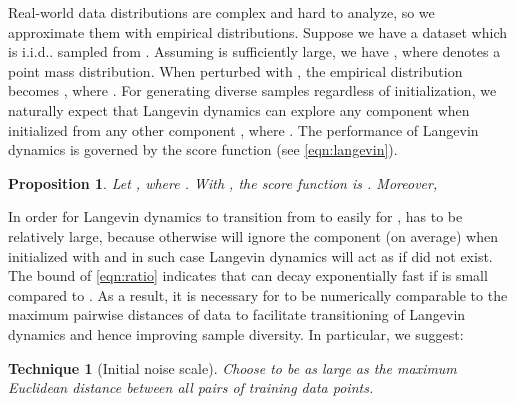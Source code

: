 \documentclass{article}
\makeatletter
\newtheorem{recipe}{Technique}
\newtheorem{proposition}{Proposition}
\def\@onedot{\ifx\@let@token.\else.\null\fi\xspace}
\DeclareRobustCommand\onedot{\futurelet\@let@token\@onedot}
\def\iid{i.i.d\onedot}
\makeatother
\begin{document}
Real-world data distributions are complex and hard to analyze, so we approximate them with empirical distributions. Suppose we have a dataset  which is \iid sampled from . Assuming  is sufficiently large, we have , where  denotes a point mass distribution. When perturbed with , the empirical distribution becomes , where . For generating diverse samples regardless of initialization, we naturally expect that Langevin dynamics can explore any component  when initialized from any other component , where . The performance of Langevin dynamics is governed by the score function  (see \cref{eqn:langevin}).

\begin{proposition}\label{prop:init_noise}
Let , where . With , the score function is . Moreover,

\end{proposition}
In order for Langevin dynamics to transition from  to  easily for ,  has to be relatively large, because otherwise  will ignore the component  (on average) when initialized with  and in such case Langevin dynamics will act as if  did not exist. The bound of \cref{eqn:ratio} indicates that  can decay exponentially fast if  is small compared to . As a result, it is necessary for  to be numerically comparable to the maximum pairwise distances of data to facilitate transitioning of Langevin dynamics and hence improving sample diversity. In particular, we suggest: 
\begin{recipe}[Initial noise scale]\label{rec:init_noise}
    Choose  to be as large as the maximum Euclidean distance between all pairs of training data points.\end{recipe}
\end{document}
